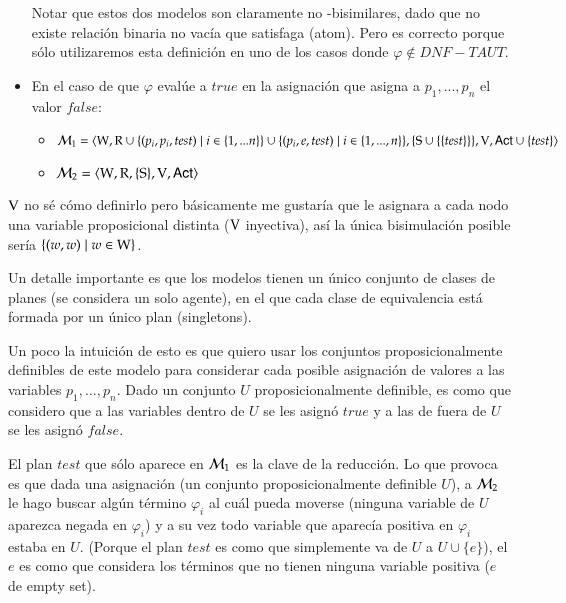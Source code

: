 \begin{demostracion}
\begin{itemize}
        Notar que estos dos modelos son claramente no \KHilogic-bisimilares, dado que no existe relación binaria no vacía que satisfaga (atom). Pero es correcto porque sólo utilizaremos esta definición en uno de los casos donde $\varphi \not \in DNF-TAUT$. 
        
        \item En el caso de que $\varphi$ evalúe a $true$ en la asignación que asigna a $p_1,...,p_n$ el valor $false$:
        
        \begin{itemize}
            \item $\mathcal{M}_1=\langle \mathrm{W},\mathrm{R} \cup \{(p_i,p_i,test) \mid i \in \{1,...n\}\} \cup \{(p_i,e,test)\mid i \in \{1,...,n\}\},\{\mathrm{S} \cup \{\{test\}\} \},\mathrm{V},{\rm \sf Act} \cup \{test\} \rangle$
            \item $\mathcal{M}_2=\langle \mathrm{W},\mathrm{R},\{ \mathrm{S} \},\mathrm{V},{\rm \sf Act} \rangle$
        \end{itemize}
    \end{itemize}

    

    $\mathrm{V}$ no sé cómo definirlo pero básicamente me gustaría que le asignara a cada nodo una variable proposicional distinta ($\mathrm{V}$ inyectiva), así la única bisimulación posible sería $\{(w,w) \mid w \in \mathrm{W}\}$.

    Un detalle importante es que los modelos tienen un único conjunto de clases de planes (se considera un solo agente), en el que cada clase de equivalencia está formada por un único plan (singletons). 


\medskip\medskip

    Un poco la intuición de esto es que quiero usar los conjuntos proposicionalmente definibles de este modelo para considerar cada posible asignación de valores a las variables $p_1,...,p_n$. Dado un conjunto $U$ proposicionalmente definible, es como que considero que a las variables dentro de $U$ se les asignó $true$ y a las de fuera de $U$ se les asignó $false$. 

    El plan $test$ que sólo aparece en $\mathcal{M}_1$ es la clave de la reducción. Lo que provoca es que dada una asignación (un conjunto proposicionalmente definible $U$), a $\mathcal{M}_2$ le hago buscar algún término $\varphi_i$ al cuál pueda moverse (ninguna variable de $U$ aparezca negada en $\varphi_i$) y a su vez todo variable que aparecía positiva en $\varphi_i$ estaba en $U$. (Porque el plan $test$ es como que simplemente va de $U$ a $U \cup \{e\}$), el $e$ es como que considera los términos que no tienen ninguna variable positiva ($e$ de empty set).


\end{demostracion}
